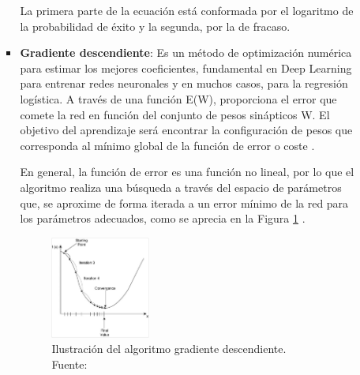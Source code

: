 \begin{itemize}
\begin{itemize}
\begin{itemize}
			La primera parte de la ecuación está conformada por el logaritmo de la probabilidad de éxito y la segunda, por la de fracaso.
			
			\item \textbf{Gradiente descendiente}: Es un método de optimización numérica para estimar los mejores coeficientes, fundamental en Deep Learning para entrenar redes neuronales y en muchos casos, para la regresión logística. A través de una función E(W), proporciona el error que comete la red en función del conjunto de pesos sinápticos W. El objetivo del aprendizaje será encontrar la configuración de pesos que corresponda al mínimo global de la función de error o coste \parencite{tec_bertona2005algevol}.
			
			En general, la función de error es una función no lineal, por lo que el algoritmo realiza una búsqueda a través del espacio de parámetros que, se aproxime de forma iterada a un error mínimo de la red para los parámetros adecuados, como se aprecia en la Figura \ref{2:fig13} \parencite{tec_sancho2017descentgrad}.
			\begin{figure}[h]
				\begin{center}
					\includegraphics[width=0.35\textwidth]{2/figures/gradiente_descendiente.jpg}
					\caption[Ilustración del algoritmo gradiente descendiente]{Ilustración del algoritmo gradiente descendiente.\\
					Fuente: \cite{tec_sancho2017descentgrad}}
					\label{2:fig13}
				\end{center}
			\end{figure}
			

\end{itemize}
\end{itemize}
\end{itemize}
